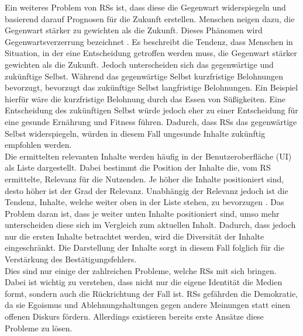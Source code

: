 Ein weiteres Problem von \acp{RS} ist, dass diese die Gegenwart widerspiegeln und basierend darauf Prognosen für die Zukunft erstellen.
Menschen neigen dazu, die Gegenwart stärker zu gewichten als die Zukunft.
Dieses Phänomen wird Gegenwartsverzerrung bezeichnet \cite{present-bias}.
Es beschreibt die Tendenz, dass Menschen in Situation, in der eine Entscheidung getroffen werden muss, die Gegenwart stärker gewichten als die Zukunft.
Jedoch unterscheiden sich das gegenwärtige und zukünftige Selbst.
Während das gegenwärtige Selbst kurzfristige Belohnungen bevorzugt, bevorzugt das zukünftige Selbst langfristige Belohnungen.
Ein Beispiel hierfür wäre die kurzfristige Belohnung durch das Essen von Süßigkeiten.
Eine Entscheidung des zukünftigen Selbst würde jedoch eher zu einer Entscheidung für eine gesunde Ernährung und Fitness führen.
Dadurch, dass \acp{RS} das gegenwärtige Selbst widerspiegeln, würden in diesem Fall ungesunde Inhalte zukünftig empfohlen werden. \\

Die ermittelten relevanten Inhalte werden häufig in der Benutzeroberfläche (\ac{UI}) als Liste dargestellt.
Dabei bestimmt die Position der Inhalte die, vom \ac{RS} ermittelte, Relevanz für die Nutzenden.
Je höher die Inhalte positioniert sind, desto höher ist der Grad der Relevanz.
Unabhängig der Relevanz jedoch ist die Tendenz, Inhalte, welche weiter oben in der Liste stehen, zu bevorzugen \cite{position-bias}.
Das Problem daran ist, dass je weiter unten Inhalte positioniert sind, umso mehr unterscheiden diese sich im Vergleich zum aktuellen Inhalt.
Dadurch, dass jedoch nur die ersten Inhalte betrachtet werden, wird die Diversität der Inhalte eingeschränkt.
Die Darstellung der Inhalte sorgt in diesem Fall folglich für die Verstärkung des Bestätigungsfehlers. \\

Dies sind nur einige der zahlreichen Probleme, welche \acp{RS} mit sich bringen.
Dabei ist wichtig zu verstehen, dass nicht nur die eigene Identität die Medien formt, sondern auch die Rückrichtung der Fall ist.
\acp{RS} gefährden die Demokratie, da sie Egoismus und Ablehnungshaltungen gegen andere Meinungen statt einen offenen Diskurs fördern.
Allerdings existieren bereits erste Ansätze diese Probleme zu lösen. \\

